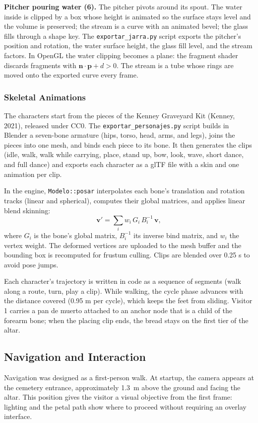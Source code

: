 \documentclass[letter,12pt]{article}
\begin{document}
	\textbf{Pitcher pouring water (6).} The pitcher pivots around its spout. The water inside is clipped by a box whose height is animated so the surface stays level and the volume is preserved; the stream is a curve with an animated bevel; the glass fills through a shape key. The \texttt{exportar\_jarra.py} script exports the pitcher's position and rotation, the water surface height, the glass fill level, and the stream factors. In OpenGL the water clipping becomes a plane: the fragment shader discards fragments with $\mathbf{n}\cdot\mathbf{p} + d > 0$. The stream is a tube whose rings are moved onto the exported curve every frame.

	\subsubsection{Skeletal Animations}
	The characters start from the pieces of the Kenney Graveyard Kit (Kenney, 2021), released under CC0. The \texttt{exportar\_personajes.py} script builds in Blender a seven-bone armature (hips, torso, head, arms, and legs), joins the pieces into one mesh, and binds each piece to its bone. It then generates the clips (idle, walk, walk while carrying, place, stand up, bow, look, wave, short dance, and full dance) and exports each character as a glTF file with a skin and one animation per clip.

	In the engine, \texttt{Modelo::posar} interpolates each bone's translation and rotation tracks (linear and spherical), computes their global matrices, and applies linear blend skinning:
	\begin{equation}
		\mathbf{v}' = \sum_{i} w_i \, G_i \, B_i^{-1} \, \mathbf{v},
	\end{equation}
	where $G_i$ is the bone's global matrix, $B_i^{-1}$ its inverse bind matrix, and $w_i$ the vertex weight. The deformed vertices are uploaded to the mesh buffer and the bounding box is recomputed for frustum culling. Clips are blended over 0.25 s to avoid pose jumps.

	Each character's trajectory is written in code as a sequence of segments (walk along a route, turn, play a clip). While walking, the cycle phase advances with the distance covered (0.95 m per cycle), which keeps the feet from sliding. Visitor 1 carries a pan de muerto attached to an anchor node that is a child of the forearm bone; when the placing clip ends, the bread stays on the first tier of the altar.

	\subsection{Navigation and Interaction}
	Navigation was designed as a first-person walk. At startup, the camera appears at the cemetery entrance, approximately 1.3~m above the ground and facing the altar. This position gives the visitor a visual objective from the first frame: lighting and the petal path show where to proceed without requiring an overlay interface.
\end{document}
